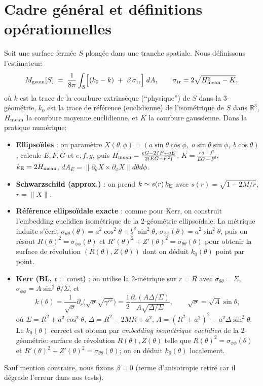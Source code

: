\documentclass[11pt]{article}
\begin{document}
\section{Cadre g\'en\'eral et d\'efinitions op\'erationnelles}
Soit une surface ferm\'ee $S$ plong\'ee dans une tranche spatiale. Nous d\'efinissons l'estimateur:
\begin{equation}
M_{\rm geom}[S] \;=\; \frac{1}{8\pi}\int_S\!\Big[(k_0 - k)\;+\;\beta\,\sigma_{\rm tr}\Big]\; dA,
\qquad \sigma_{\rm tr}=2\sqrt{H_{\rm mean}^2-K},
\end{equation}
o\`u $k$ est la trace de la courbure extrins\`eque (``physique'') de $S$ dans la 3-g\'eom\'etrie, 
$k_0$ est la trace de r\'ef\'erence (euclidienne) de l'iso\-m\'etrique de $S$ dans $\mathbb{R}^3$, $H_{\rm mean}$ la courbure moyenne euclidienne, et $K$ la courbure gaussienne. 
Dans la pratique num\'erique:
\begin{itemize}
\item \textbf{Ellipso\"ides} : on param\`etre $X(\theta,\phi)=(a\sin\theta\cos\phi,\;a\sin\theta\sin\phi,\;b\cos\theta)$, calcule $E,F,G$ et $e,f,g$, puis 
$H_{\rm mean}=\frac{eG-2fF+gE}{2(EG-F^2)}$, $K=\frac{eg-f^2}{EG-F^2}$, $k_{\rm E}=2H_{\rm mean}$, $dA_E=\|\partial_\theta X\times\partial_\phi X\|d\theta d\phi$.
\item \textbf{Schwarzschild (approx.)} : on prend $k\simeq s(r)\,k_{\rm E}$ avec $s(r)=\sqrt{1-2M/r}$, $r=\|X\|$. 
\item \textbf{R\'ef\'erence ellipso\"idale exacte} : comme pour Kerr, on construit l'embedding euclidien isom\'etrique de la 2-g\'eom\'etrie ellipso\"idale. La m\'etrique induite s'\'ecrit $\sigma_{\theta\theta}(\theta) = a^2\cos^2\theta + b^2\sin^2\theta$, $\sigma_{\phi\phi}(\theta) = a^2\sin^2\theta$, puis on r\'esout $R(\theta)^2 = \sigma_{\phi\phi}(\theta)$ et $R'(\theta)^2 + Z'(\theta)^2 = \sigma_{\theta\theta}(\theta)$ pour obtenir la surface de r\'evolution $(R(\theta), Z(\theta))$ dont on d\'eduit $k_0(\theta)$ point par point.
\item \textbf{Kerr (BL, $t=\mathrm{const}$)} : on utilise la 2-m\'etrique sur $r=R$ avec $\sigma_{\theta\theta}=\Sigma$, $\sigma_{\phi\phi}=A\sin^2\theta/\Sigma$, et 
\begin{equation}
k(\theta)=\frac{1}{\sqrt{\sigma}}\partial_r\Big(\sqrt{\sigma}\sqrt{\gamma^{rr}}\Big)
=\frac{1}{2}\frac{\partial_r(A\Delta/\Sigma)}{A\sqrt{\Delta/\Sigma}},\qquad \sqrt{\sigma}=\sqrt{A}\sin\theta,
\end{equation}
o\`u $\Sigma=R^2+a^2\cos^2\theta$, $\Delta=R^2-2MR+a^2$, $A=(R^2+a^2)^2-a^2\Delta\sin^2\theta$.
Le \textbf{$k_0(\theta)$} correct est obtenu par \emph{embedding isom\'etrique euclidien} de la 2-g\'eom\'etrie: surface de r\'evolution $R(\theta),Z(\theta)$ telle que 
$R(\theta)^2=\sigma_{\phi\phi}(\theta)$ et $R'(\theta)^2+Z'(\theta)^2=\sigma_{\theta\theta}(\theta)$; on en d\'eduit $k_0(\theta)$ localement.
\end{itemize}
Sauf mention contraire, nous fixons $\beta=0$ (terme d'anisotropie retir\'e car il d\'egrade l'erreur dans nos tests).
\end{document}
